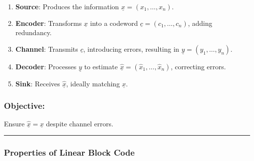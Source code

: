 \documentclass[11pt]{article}
\providecommand{\tightlist}{%
      \setlength{\itemsep}{0pt}\setlength{\parskip}{0pt}}
\begin{document}
\begin{enumerate}
\def\labelenumi{\arabic{enumi}.}
\tightlist
\item
  \textbf{Source}: Produces the information
  \(\underline{x} = (x_1, \dots, x_n)\).\\
\item
  \textbf{Encoder}: Transforms \(\underline{x}\) into a codeword
  \(\underline{c} = (c_1, \dots, c_n)\), adding redundancy.\\
\item
  \textbf{Channel}: Transmits \(\underline{c}\), introducing errors,
  resulting in \(\underline{y} = (y_1, \dots, y_n)\).\\
\item
  \textbf{Decoder}: Processes \(\underline{y}\) to estimate
  \(\hat{\underline{x}} = (\hat{x}_1, \dots, \hat{x}_n)\), correcting
  errors.\\
\item
  \textbf{Sink}: Receives \(\hat{\underline{x}}\), ideally matching
  \(\underline{x}\).
\end{enumerate}

\subsubsection{Objective:}\label{objective}

Ensure \(\hat{\underline{x}} = \underline{x}\) despite channel errors.

\begin{center}\rule{0.5\linewidth}{0.5pt}\end{center}

\subsubsection{Properties of Linear Block
Code}\label{properties-of-linear-block-code}
\end{document}
